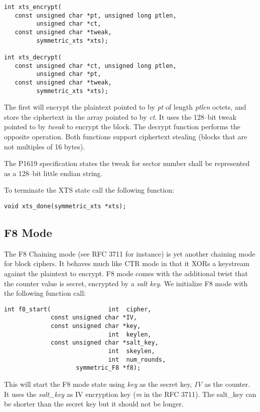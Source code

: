 \documentclass[synpaper]{book}
\begin{document}
 
\begin{verbatim}
int xts_encrypt(
   const unsigned char *pt, unsigned long ptlen,
         unsigned char *ct,
   const unsigned char *tweak,
         symmetric_xts *xts);

int xts_decrypt(
   const unsigned char *ct, unsigned long ptlen,
         unsigned char *pt,
   const unsigned char *tweak,
         symmetric_xts *xts);
\end{verbatim}
The first will encrypt the plaintext pointed to by \textit{pt} of length \textit{ptlen} octets, and store the ciphertext in the array pointed to by 
\textit{ct}.  It uses the 128--bit tweak pointed to by \textit{tweak} to encrypt the block.  The decrypt function performs the opposite operation.  Both 
functions support ciphertext stealing (blocks that are not multiples of 16 bytes).  

The P1619 specification states the tweak for sector number shall be represented as a 128--bit little endian string.  

To terminate the XTS state call the following function:

\begin{verbatim}
void xts_done(symmetric_xts *xts);
\end{verbatim}


\subsection{F8 Mode}
The F8 Chaining mode (see RFC 3711 for instance) is yet another chaining mode for block ciphers.  It behaves much like CTR mode in that it XORs a keystream
against the plaintext to encrypt.  F8 mode comes with the additional twist that the counter value is secret, encrypted by a \textit{salt key}.  We
initialize F8 mode with the following function call:

\begin{verbatim}
int f8_start(                int  cipher, 
             const unsigned char *IV, 
             const unsigned char *key,     
                             int  keylen, 
             const unsigned char *salt_key,               
                             int  skeylen,
                             int  num_rounds,   
                    symmetric_F8 *f8);
\end{verbatim}
This will start the F8 mode state using \textit{key} as the secret key, \textit{IV} as the counter.  It uses the \textit{salt\_key} as IV encryption key 
(\textit{m} in the RFC 3711).  The salt\_key can be shorter than the secret key but it should not be longer.  
\end{document}
